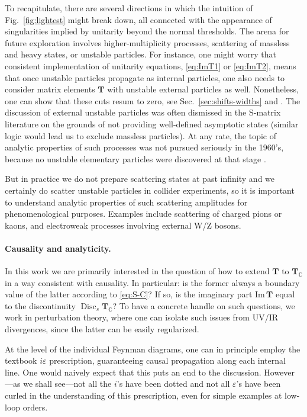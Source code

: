 \documentclass[12pt]{article}
\numberwithin{figure}{section}
\DeclareMathOperator{\Disc}{Disc}
\def \C {\mathbb{C}}
\def \eps {\varepsilon}
\def \Im {\mathrm{Im}}
\def \T {\mathbf{T}}
\begin{document}
	
	To recapitulate, there are several directions in which the intuition of Fig.~\ref{fig:lightest} might break down, all connected with the appearance of singularities implied by unitarity beyond the normal thresholds. The arena for future exploration involves higher-multiplicity processes, scattering of massless and heavy states, or unstable particles.
	For instance, one might worry that consistent implementation of unitarity equations, \eqref{eq:ImT1} or \eqref{eq:ImT2}, means that once unstable particles propagate as internal particles, one also needs to consider matrix elements $\mathbf{T}$ with unstable external particles as well. Nonetheless, one can show that these cuts resum to zero, see Sec.~\ref{sec:shifts-widths} and \cite{Veltman:1963th}.
	The discussion of external unstable particles was often dismissed in the S-matrix literature on the grounds of not providing well-defined asymptotic states (similar logic would lead us to exclude massless particles). At any rate, the topic of analytic properties of such processes was not pursued seriously in the 1960's, because no unstable elementary particles were discovered at that stage \cite{Mandelstam_1962}.
	
	
	
	But in practice we do not prepare scattering states at past infinity and we certainly do scatter unstable particles in collider experiments, so it is important to understand analytic properties of such scattering amplitudes for phenomenological purposes.
	Examples include scattering of charged pions or kaons, and electroweak processes involving external W/Z bosons.
	

	
	\paragraph{Causality and analyticity.}
	In this work we are primarily interested in the question of how to extend $\T$ to $\T_\C$ in a way consistent with causality. In particular: is the former always a boundary value of the latter according to \eqref{eq:S-C}? If so, is the imaginary part $\Im\, \T$ equal to the discontinuity $\Disc_s \T_\C$?
	To have a concrete handle on such questions, we work in perturbation theory, where one can isolate such issues from UV/IR divergences, since the latter can be easily regularized.
	
	At the level of the individual Feynman diagrams, one can in principle employ the textbook $i\eps$ prescription, guaranteeing causal propagation along each internal line.
	One would naively expect that this puts an end to the discussion. However---as we shall see---not all the $i$'s have been dotted and not all $\eps$'s have been curled in the understanding of this prescription, even for simple examples at low-loop orders.
	
\end{document}
